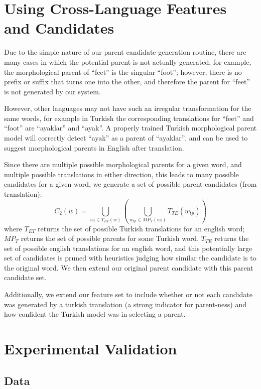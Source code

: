 \documentclass[11pt,twocolumn]{article}
\begin{document}
\section{Using Cross-Language Features and Candidates}
Due to the simple nature of our parent candidate generation routine,
there are many cases in which the potential parent is not actually generated;
for example, the morphological parent of ``feet'' is the singular ``foot'';
however, there is no prefix or suffix that turns one into the other, and
therefore the parent for ``feet'' is not generated by our system.

However, other languages may not have such an irregular transformation
for the same words, for example in Turkish the corresponding translations
for ``feet'' and ``foot'' are ``ayaklar'' and ``ayak''. A properly trained Turkish
morphological parent model will correctly detect ``ayak'' as a parent of ``ayaklar'',
and can be used to suggest morphological parents in English after translation.

Since there are multiple possible morphological parents for a given word, and multiple
possible translations in either direction, this leads to many possible candidates for a given word,
we generate a set of possible parent candidates (from translation):
\begin{equation}
    C_2(w) = \bigcup_{w_t \in T_{ET}(w)}\left(\bigcup_{w_{tp} \in MP_T (w_t)} T_{TE}(w_{tp})\right)
\end{equation}
where $T_{ET}$ returns the set of possible Turkish translations
for an english word; $MP_T$ returns the set of possible parents for some Turkish word,
$T_{TE}$ returns the set of possible english translations for an english word,
and this potentially large set of candidates is pruned with heuristics judging
how similar the candidate is to the original word. We then extend our original parent candidate
with this parent candidate set.

Additionally, we extend our feature set to include whether or not each candidate was
generated by a turkish translation (a strong indicator for parent-ness) and how confident
the Turkish model was in selecting a parent.

\section{Experimental Validation}

\subsection{Data}
\end{document}

